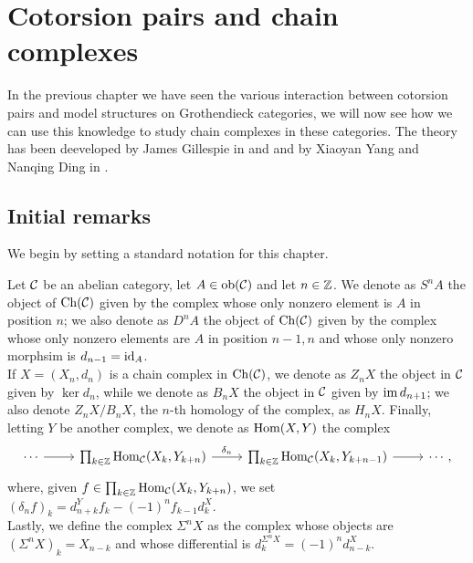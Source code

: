 \chapter{Cotorsion pairs and chain complexes}

In the previous chapter we have seen the various interaction between cotorsion pairs and model structures on Grothendieck categories, we will now see how we can use this knowledge to study chain complexes in these categories. The theory has been deeveloped by James Gillespie in \cite{Gillespie2004Flat} and \cite{Gillespie2006Quillen} and by Xiaoyan Yang and Nanqing Ding in \cite{DingYang2014}.


\section{Initial remarks}

We begin by setting a standard notation for this chapter.

\begin{notation}
    Let $\mathcal{C}$ be an abelian category, let $A \in \mathrm{ob}(\mathcal{C})$ and let $n \in \mathbb{Z}$. We denote as $S^n A$ the object of $\mathrm{Ch}(\mathcal{C})$ given by the complex whose only nonzero element is $A$ in position $n$; we also denote as $D^n A$ the object of $\mathrm{Ch}(\mathcal{C})$ given by the complex whose only nonzero elements are $A$ in position $n-1, n$  and whose only nonzero morphsim is $d_{n-1} = \mathrm{id}_A$.\\ 
    If $X = (X_n, d_n)$ is a chain complex in $\mathrm{Ch}(\mathcal{C})$, we denote as $Z_nX$ the object in $\mathcal{C}$ given by $\ker d_n$, while we denote as $B_nX$ the object in $\mathcal{C}$ given by $\operatorname{im} d_{n+1}$; we also denote $Z_nX/B_nX$, the $n$-th homology of the complex, as $H_n X$.
    Finally, letting $Y$ be another complex, we denote as $\mathrm{Hom}(X, Y)$ the complex 
    \[\begin{tikzcd}
        \cdots & {\prod_{k \in \Z}\Hom_\C(X_k, Y_{k+n})} & {\prod_{k \in \Z}\Hom_\C(X_k, Y_{k+n-1})} & {\cdots,}
        \arrow[from=1-1, to=1-2]
        \arrow["{\delta_n}", from=1-2, to=1-3]
        \arrow[from=1-3, to=1-4]
    \end{tikzcd}\]
    where, given $f \in {\prod_{k \in \mathbb{Z}}\mathrm{Hom}_{\mathcal{C}}(X_k, Y_{k+n})}$, we set $(\delta_n f)_k =  d^Y_{n+k} f_k - (-1)^n f_{k-1}d^X_k$.  \\
    Lastly, we define the complex $\Sigma^n X$ as the complex whose objects are $(\Sigma^nX)_k = X_{n-k}$ and whose differential is $d^{\Sigma^n X}_k = (-1)^n d^X_{n-k}$.
\end{notation}



